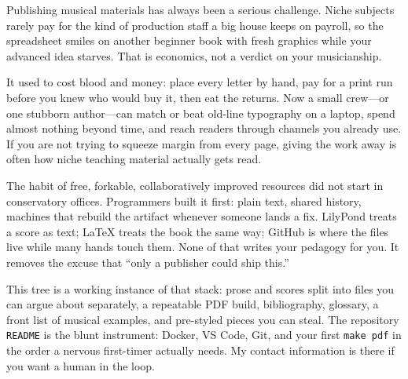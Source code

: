 Publishing musical materials has always been a serious challenge. Niche subjects rarely pay for the kind of production staff a big house keeps on payroll, so the spreadsheet smiles on another beginner book with fresh graphics while your advanced idea starves. That is economics, not a verdict on your musicianship.

It used to cost blood and money: place every letter by hand, pay for a print run before you knew who would buy it, then eat the returns. Now a small crew---or one stubborn author---can match or beat old-line typography on a laptop, spend almost nothing beyond time, and reach readers through channels you already use. If you are not trying to squeeze margin from every page, giving the work away is often how niche teaching material actually gets read.

The habit of free, forkable, collaboratively improved resources did not start in conservatory offices. Programmers built it first: plain text, shared history, machines that rebuild the artifact whenever someone lands a fix. LilyPond treats a score as text; LaTeX treats the book the same way; GitHub is where the files live while many hands touch them. None of that writes your pedagogy for you. It removes the excuse that ``only a publisher could ship this.''

This \ProjectName tree is a working instance of that stack: prose and scores split into files you can argue about separately, a repeatable PDF build, bibliography, glossary, a front list of musical examples, and pre-styled pieces you can steal. The repository \texttt{README} is the blunt instrument: Docker, VS Code, Git, and your first \texttt{make pdf} in the order a nervous first-timer actually needs. My contact information is there if you want a human in the loop.
